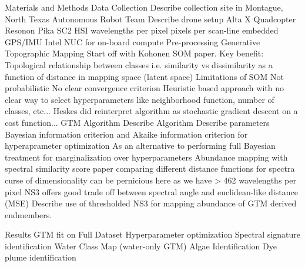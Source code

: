 \documentclass{article}
\begin{document}
\begin{outline}[enumerate]
\1 Materials and Methods
    \2 Data Collection
        \3 Describe collection site in Montague, North Texas
    \2 Autonomous Robot Team
        \3 Describe drone setup
            \4 Alta X Quadcopter
            \4 Resonon Pika SC2 HSI
                 wavelengths per pixel
                pixels per scan-line
               \5 embedded GPS/IMU
             \4 Intel NUC for on-board compute
    \2 Pre-processing
    \2 Generative Topographic Mapping
        \3 Start off with Kohonen SOM paper. Key benefit:
            \4 Topological relationship between classes i.e. similarity vs dissimilarity as a function of distance in mapping space (latent space)
        \3 Limitations of SOM
            \4 Not probabilistic
            \4 No clear convergence criterion
            \4 Heuristic based approach with no clear way to select hyperparameters like neighborhood function, number of classes, etc...
            \4 Heskes did reinterpret algorithm as stochastic gradient descent on a cost function...
        \3 GTM Algorithm
            \4 Describe Algorithm
            \4 Describe parameters
        \3 Bayesian information criterion and Akaike information criterion for hyperaprameter optimization
            \4 As an alternative to performing full Bayesian treatment for marginalization over hyperparameters
        \3 Abundance mapping with spectral similarity score
            \4 paper comparing different distance functions for spectra
                \5 curse of dimensionality can be pernicious here as we have > 462 wavelengths per pixel
            \4 NS3 offers good trade off between spectral angle and euclidean-like distance (MSE)
        \3 Describe use of thresholded NS3 for mapping abundance of GTM derived endmembers.

\1 Results
    \2  GTM fit on Full Dataset
    \2 Hyperparameter optimization
    \2 Spectral signature identification
    \2 Water Class Map (water-only GTM)
    \2 Algae Identification
    \2 Dye plume identification


\end{outline}
\end{document}
